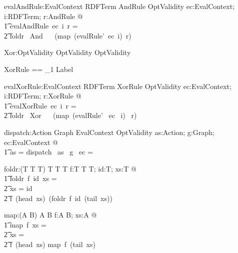 \begin{gendef}
   evalAndRule:EvalContext \fun RDFTerm \fun AndRule \fun OptValidity
\where
\forall ec:EvalContext; i:RDFTerm; r:AndRule  @ \\
\t1	evalAndRule~ec~i~r = \\
\t2		foldr~ And~ \nomatch ~ (map~(evalRule'~ec~i)~r)
\end{gendef}
		

\begin{gendef}
   Xor:OptValidity \fun OptValidity \fun OptValidity
\end{gendef}
		

\begin{zed}
XorRule == \seq_1 Label
\end{zed}
		

\begin{gendef}
   evalXorRule:EvalContext \fun RDFTerm \fun XorRule \fun OptValidity
\where
   \forall ec:EvalContext; i:RDFTerm; r:XorRule  @ \\
\t1	evalXorRule~ec~i~r = \\
\t2		foldr~ Xor~ \fail ~ (map~(evalRule'~ ec ~i)~ r)
\end{gendef}
		

\begin{zed}
[Action]
\end{zed}
		

\begin{gendef}
   dispatch:\power Action \fun Graph \fun EvalContext \fun OptValidity
\where
   \forall as:\power Action; g:Graph; ec:EvalContext @ \\
\t1 as = \emptyset \implies dispatch~ as~ g ~ec = \pass
\end{gendef}
		

\begin{gendef}[T]
   foldr:(T \fun T \fun T) \fun T \fun \seq T \fun T
\where
   \forall f:T \fun T \fun T; id:T; xs:\seq T @ \\
\t1	foldr~f~id~xs = \\
\t2 	\IF xs = \langle \rangle \THEN id \\
\t2 	\ELSE f~(head~xs)~(foldr~f~id~(tail~xs))
\end{gendef}
		

\begin{gendef}[A,B]
   map:(A \fun B) \fun \seq A \fun \seq B
\where
   \forall f:A \fun B; xs:\seq A @ \\
\t1	map~f~xs = \\
\t2 	\IF xs = \langle \rangle \THEN \langle \rangle \\
\t2 	\ELSE \langle f~(head~xs) \rangle \cat map~f~(tail~xs)
\end{gendef}
		

